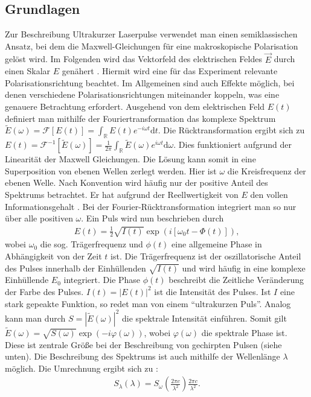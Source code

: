 \documentclass[twoside,        %
               BCOR12mm,       %
               english,ngerman, %
               fleqn,headsepline=false,footsepline=false
              ]{Vorlage/MFPREPORT}
\renewcommand{\d}{\ensuremath{\mathrm{d}}} %
\begin{document}
\subsection{Grundlagen}
Zur Beschreibung Ultrakurzer Laserpulse verwendet man einen semiklassischen
Ansatz, bei dem die Maxwell-Gleichungen für eine makroskopische Polarisation
gelöst wird. Im Folgenden wird das Vektorfeld des elektrischen Feldes $\vec E$
durch einen Skalar $E$ genähert \cite{Diels2006}. Hiermit wird eine für das Experiment
relevante Polarisationsrichtung beachtet. Im Allgemeinen sind auch Effekte
möglich, bei denen verschiedene Polarisationsrichtungen miteinander koppeln,
was eine genauere Betrachtung erfordert.
Ausgehend von dem elektrischen Feld $E(t)$ definiert man mithilfe der Fouriertransformation das komplexe Spektrum
$\tilde{E}(\omega)=\mathcal{F}[E(t)]=\int_\mathbb{R}E(t)e^{-i\omega t}\d t
\label{eq:FT}$.
Die Rücktransformation ergibt sich zu $E(t)=\mathcal{F}^{-1}[\tilde
E(\omega)]=\frac{1}{2\pi}\int_{\mathbb R}\tilde E(\omega)e^{i\omega t}\d
\omega$. Dies funktioniert aufgrund der Linearität der Maxwell Gleichungen. Die
Lösung kann somit in eine Superposition von ebenen Wellen zerlegt werden. Hier
ist $\omega$ die Kreisfrequenz der ebenen Welle. Nach Konvention wird häufig
nur der positive Anteil des Spektrums betrachtet. Er hat aufgrund der
Reellwertigkeit von $E$ den vollen Informationsgehalt \cite{Diels2006}
. Bei der Fourier-Rücktransformation integriert man so nur über alle
positiven $\omega$.
Ein Puls wird nun beschrieben durch \cite{trebinolec}
\begin{align}
    E(t)=\frac{1}{2}\sqrt{I(t)}\exp\left(i\left[ \omega _0 t-\Phi(t)
    \right]\right),
    \label{eq:efield}
\end{align}
wobei $\omega_0$ die sog. Trägerfrequenz und $\phi(t)$ eine allgemeine Phase in
Abhängigkeit von der Zeit $t$ ist. Die Trägerfrequenz ist der oszillatorische
Anteil des Pulses innerhalb der Einhüllenden $\sqrt{I(t)}$ und wird häufig in
eine komplexe Einhüllende $E_0$ integriert. Die Phase $\phi(t)$ beschreibt die
Zeitliche Veränderung der Farbe des Pulses. $I(t)=|E(t)|^2$ ist die
Intensität des Pulses. Ist $I$ eine stark gepeakte Funktion, so redet man von
einem ``ultrakurzen Puls''. Analog kann man durch $S=|\tilde E(\omega)|^2$ die
spektrale Intensität einführen. Somit gilt $\tilde
E(\omega)=\sqrt{S(\omega)}\exp(-i\varphi(\omega))\label{eq:spectrum}$, wobei
$\varphi(\omega)$ die spektrale Phase ist. Diese ist zentrale Größe bei der 
Beschreibung von gechirpten Pulsen (siehe unten).
Die Beschreibung des Spektrums ist auch mithilfe der Wellenlänge $\lambda$
möglich. Die Umrechnung ergibt sich zu \cite{trebinolec}:
\begin{align}
    S_\lambda(\lambda)=S_\omega\left(\frac{2\pi c}{\lambda^2}\right)\frac{2\pi
    c}{\lambda^2}.
    \label{eq:lambdaspec}
\end{align}
\end{document}
